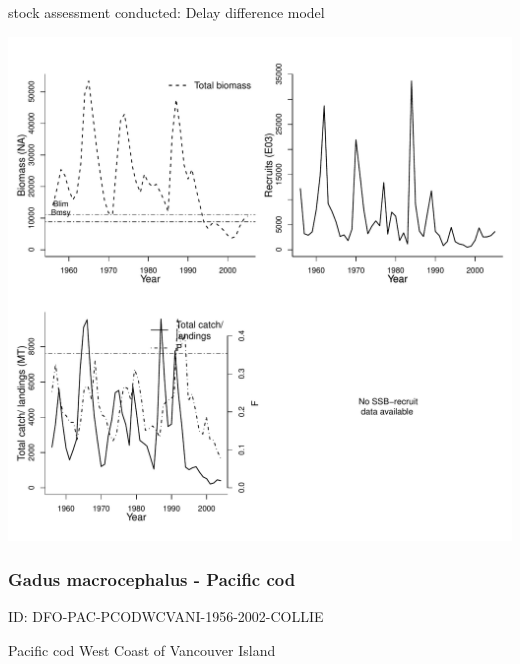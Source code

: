 stock assessment conducted: Delay difference model 
\begin{center}
\vspace{-0.2cm}\includegraphics[scale=0.65]{../tex/figures/plot-DFO-PAC-PCODHS-1956-2005-COLLIE.pdf}
\end{center}

\newpage
\subsubsection{Gadus macrocephalus - Pacific cod}
ID: DFO-PAC-PCODWCVANI-1956-2002-COLLIE

Pacific cod West Coast of Vancouver Island 

